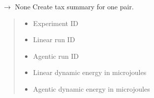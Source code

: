 \documentclass[letterpaper,10pt,english]{sphinxmanual}
\begin{document}
\begin{fulllineitems}
\begin{fulllineitems}
\label{\detokenize{core.database.manager:core.database.manager.DatabaseManager.create_tax_summary_for_pair}}
\pysigstartsignatures
\pysiglinewithargsret
{}
{\sphinxparamcomma {}\sphinxparamcomma {}\sphinxparamcomma {}\sphinxparamcomma {}\sphinxparamcomma {}}
{{ $\rightarrow$ None}}
\pysigstopsignatures
\sphinxAtStartPar
Create tax summary for one pair.
\begin{quote}\begin{description}
\begin{itemize}
\item {} 
\sphinxAtStartPar
{} \textendash{} Experiment ID

\item {} 
\sphinxAtStartPar
{} \textendash{} Linear run ID

\item {} 
\sphinxAtStartPar
{} \textendash{} Agentic run ID

\item {} 
\sphinxAtStartPar
{} \textendash{} Linear dynamic energy in microjoules

\item {} 
\sphinxAtStartPar
{} \textendash{} Agentic dynamic energy in microjoules

\end{itemize}

\end{description}\end{quote}

\end{fulllineitems}


\end{fulllineitems}
\end{document}
